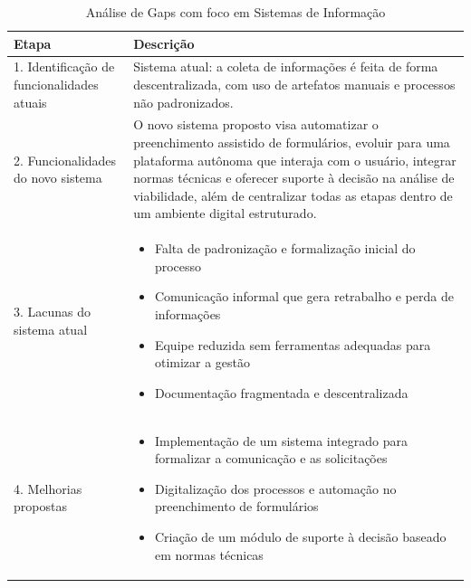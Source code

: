 \documentclass[12pt,a4paper]{article}
\begin{document}
\begin{table}[htbp]
\centering
\begin{tcolorbox}[enhanced, colback=white, colframe=gray!40, arc=3mm, boxrule=0.5pt, width=0.85\linewidth]
\begin{tabular}{|p{2cm}|p{9.5cm}|}
\hline
\rowcolor{gray!20}
\textbf{Etapa} & \textbf{Descrição} \\
\hline
1. Identificação de funcionalidades atuais & Sistema atual: a coleta de informações é feita de forma descentralizada, com uso de artefatos manuais e processos não padronizados. \\
\hline
2. Funcionalidades do novo sistema & O novo sistema proposto visa automatizar o preenchimento assistido de formulários, evoluir para uma plataforma autônoma que interaja com o usuário, integrar normas técnicas e oferecer suporte à decisão na análise de viabilidade, além de centralizar todas as etapas dentro de um ambiente digital estruturado. \\
\hline
3. Lacunas do sistema atual & \begin{itemize}\setlength{\itemsep}{0pt}
\item Falta de padronização e formalização inicial do processo
\item Comunicação informal que gera retrabalho e perda de informações
\item Equipe reduzida sem ferramentas adequadas para otimizar a gestão
\item Documentação fragmentada e descentralizada
\end{itemize} \\
\hline
4. Melhorias propostas & \begin{itemize}\setlength{\itemsep}{0pt}
\item Implementação de um sistema integrado para formalizar a comunicação e as solicitações
\item Digitalização dos processos e automação no preenchimento de formulários
\item Criação de um módulo de suporte à decisão baseado em normas técnicas
\end{itemize} \\
\hline
\end{tabular}
\end{tcolorbox}
\caption{Análise de Gaps com foco em Sistemas de Informação}
\end{table}
\end{document}
